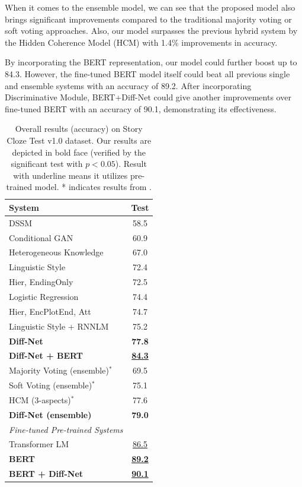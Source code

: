 \documentclass[letterpaper]{article} %
\begin{document}
When it comes to the ensemble model, we can see that the proposed model also brings significant improvements compared to the traditional majority voting or soft voting approaches.
Also, our model surpasses the previous hybrid system by the Hidden Coherence Model (HCM) \cite{chaturvedi-etal-2017} with 1.4\% improvements in accuracy.

By incorporating the BERT representation, our model could further boost up to 84.3.
However, the fine-tuned BERT model itself could beat all previous single and ensemble systems with an accuracy of 89.2.
After incorporating Discriminative Module, BERT+Diff-Net could give another improvements over fine-tuned BERT with an accuracy of 90.1, demonstrating its effectiveness.

\begin{table}[tp]
\small
\begin{center}
\begin{tabular}{lc}
\toprule
{\bf System} & {\bf Test } \\
\midrule
DSSM \cite{mostafazadeh-etal-2016} 						& 58.5 \\
Conditional GAN \cite{bingning-etal-2017} 					& 60.9 \\
Heterogeneous Knowledge \cite{lin-etal-2017} 				& 67.0 \\
Linguistic Style \cite{schwartz-etal-2017} 					& 72.4 \\
Hier, EndingOnly \cite{cai-etal-2017} 						& 72.5 \\
Logistic Regression \cite{chaturvedi-etal-2017} 				& 74.4 \\
Hier, EncPlotEnd, Att \cite{cai-etal-2017}					& 74.7 \\
Linguistic Style + RNNLM \cite{schwartz-etal-2017} 			& 75.2 \\
\bf Diff-Net											& {\bf 77.8} \\
\bf Diff-Net + BERT										& {\bf \underline{84.3}} \\
\midrule
Majority Voting (ensemble)$^*$ 							& 69.5 \\
Soft Voting (ensemble)$^*$								& 75.1 \\
HCM (3-aspects)$^*$									& 77.6 \\
\bf Diff-Net (ensemble) 									& {\bf 79.0} \\
\midrule \midrule
\em{Fine-tuned Pre-trained Systems}\\
Transformer LM \cite{openai-gpt}							& \underline{86.5} \\
\bf BERT												& {\bf \underline{89.2}} \\
\bf BERT + Diff-Net										& {\bf \underline{90.1}} \\
\bottomrule
\end{tabular}
\end{center}
\caption{\label{overall-results} Overall results (accuracy) on Story Cloze Test v1.0 dataset. Our results are depicted in bold face (verified by the significant test with $p<0.05$). Result with underline means it utilizes pre-trained model. * indicates results from \citeauthor{chaturvedi-etal-2017} .   }
\end{table}
\end{document}
